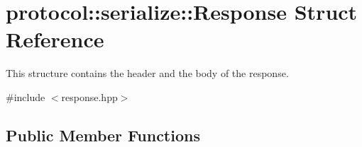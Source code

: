 \hypertarget{structprotocol_1_1serialize_1_1_response}{}\section{protocol\+:\+:serialize\+:\+:Response Struct Reference}
\label{structprotocol_1_1serialize_1_1_response}


This structure contains the header and the body of the response.  




{\ttfamily \#include $<$response.\+hpp$>$}

\subsection*{Public Member Functions}
